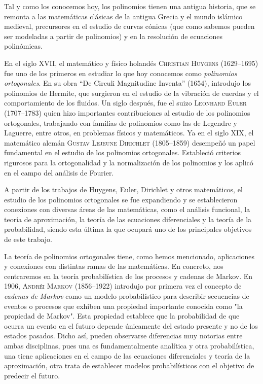 %
%

Tal y como los conocemos hoy, los polinomios tienen una antigua historia, que se remonta a las matemáticas clásicas de la antigua Grecia y el mundo islámico medieval, precursores en el estudio de curvas cónicas (que como sabemos pueden ser modeladas a partir de polinomios) y en la resolución de ecuaciones polinómicas.

En el siglo XVII, el matemático y físico holandés \textsc{Christian Huygens} (1629--1695) fue uno de los primeros en estudiar lo que hoy conocemos como \textit{polinomios ortogonales}. En su obra ``De Circuli Magnitudine Inventa'' (1654), introdujo los polinomios de Hermite, que surgieron en el estudio de la vibración de cuerdas y el comportamiento de los fluidos. Un siglo después, fue el suizo \textsc{Leonhard Euler} (1707--1783) quien hizo importantes contribuciones al estudio de los polinomios ortogonales, trabajando con familias de  polinomios como las de Legendre y Laguerre, entre otros, en problemas físicos y matemáticos. Ya en el siglo XIX, el matemático alemán \textsc{Gustav Lejeune Dirichlet} (1805--1859) desempeñó un papel fundamental en el estudio de los polinomios ortogonales. Estableció criterios rigurosos para la ortogonalidad y la normalización de los polinomios y los aplicó en el campo del análisis de Fourier.

A partir de los trabajos de Huygens, Euler, Dirichlet y otros matemáticos, el estudio de los polinomios ortogonales se fue expandiendo y se establecieron conexiones con diversas áreas de las matemáticas, como el análisis funcional, la teoría de aproximación, la teoría de las ecuaciones diferenciales y la teoría de la probabilidad, siendo esta última la que ocupará uno de los principales objetivos de este trabajo.

La teoría de polinomios ortogonales tiene, como hemos mencionado, aplicaciones y conexiones con distintas ramas de las matemáticas. En concreto, nos centraremos en la teoría probabilística de los procesos y cadenas de Markov. En 1906, \textsc{Andréi Markov} (1856--1922) introdujo por primera vez el concepto de \textit{cadenas de Markov} como un modelo probabilístico para describir secuencias de eventos o procesos que exhiben una propiedad importante conocida como "la propiedad de Markov". Esta propiedad establece que la probabilidad de que ocurra un evento en el futuro depende únicamente del estado presente y no de los estados pasados. Dicho así, pueden observarse diferencias muy notorias entre ambas disciplinas, pues una es fundamentalmente analítica y otra probabilística, una tiene aplicaciones en el campo de las ecuaciones diferenciales y teoría de la aproximación, otra trata de establecer modelos probabilísticos con el objetivo de predecir el futuro.

